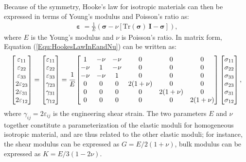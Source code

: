 Because of the symmetry, Hooke's law for isotropic materials can then be expressed in terms of Young's modulus and Poisson's ratio as:
\begin{eqnarray}
   \boldsymbol{\upepsilon} = \frac{1}{E}(\boldsymbol{\sigma} - \nu[\mathrm{Tr}(\boldsymbol{\sigma})~\mathbf{I} - \boldsymbol{\sigma}]),
\label{Equ:HookesLawInEandNu}
\end{eqnarray}
where $E$ is the Young's modulus and $\nu$ is Poisson's ratio.
In matrix form, Equation (\ref{Equ:HookesLawInEandNu}) can be written as:
\begin{eqnarray}
   \begin{bmatrix}\varepsilon_{11} \\ \varepsilon_{22} \\ \varepsilon_{33} \\ 2\varepsilon_{23} \\ 2\varepsilon_{31} \\ 2\varepsilon_{12} \end{bmatrix} =
   \begin{bmatrix}\varepsilon_{11} \\ \varepsilon_{22} \\ \varepsilon_{33} \\ \gamma_{23} \\ \gamma_{31} \\ \gamma_{12} \end{bmatrix} =
   \cfrac{1}{E}
   \begin{bmatrix} 1 & -\nu & -\nu & 0 & 0 & 0 \\
                   -\nu & 1 & -\nu & 0 & 0 & 0 \\
                   -\nu & -\nu & 1 & 0 & 0 & 0 \\
                   0 & 0 & 0 & 2(1+\nu) & 0 & 0 \\
                   0 & 0 & 0 & 0 & 2(1+\nu) & 0 \\
                   0 & 0 & 0 & 0 & 0 & 2(1+\nu) \end{bmatrix}
    \begin{bmatrix}\sigma_{11} \\ \sigma_{22} \\ \sigma_{33} \\ \sigma_{23} \\ \sigma_{31} \\ \sigma_{12} \end{bmatrix},
 \end{eqnarray}
where $\gamma_{ij} = 2\varepsilon_{ij}$ is the engineering shear strain.
The two parameters $E$ and $\nu$ together constitute a parameterization of the elastic moduli for homogeneous isotropic material, and are thus related to the other elastic moduli; for instance, the shear modulus can be expressed as $G={E}/{2(1+\nu)}$, bulk modulus can be expressed as $K = {E}/{3(1-2\nu)}$.

